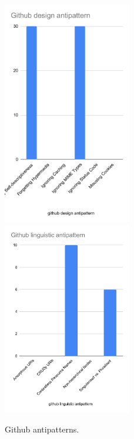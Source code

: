 \begin{figure}[htb!]
\includegraphics[width=0.5\textwidth]{img/exampleBars/githubAntiDes.pdf}
\includegraphics[width=0.5\textwidth]{img/exampleBars/githubAntiLing.pdf}
\caption{Github antipatterns.}
\label{fig:githubBarAntiEx}
\end{figure}

